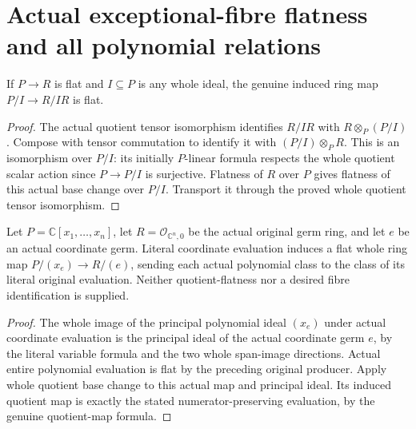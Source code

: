 \section{Actual exceptional-fibre flatness and all polynomial relations}

\begin{lemma}
\label{hir:actual-flat-quotient-ring-base-change}
\leanok
If $P\to R$ is flat and $I\subseteq P$ is any whole ideal, the genuine
induced ring map $P/I\to R/IR$ is flat.
\end{lemma}
\begin{proof}
The actual quotient tensor isomorphism identifies $R/IR$ with
$R\otimes_P(P/I)$. Compose with tensor commutation to identify it with
$(P/I)\otimes_P R$. This is an isomorphism over $P/I$: its initially
$P$-linear formula respects the whole quotient scalar action since
$P\to P/I$ is surjective. Flatness of $R$ over $P$ gives flatness of
this actual base change over $P/I$. Transport it through the proved
whole quotient tensor isomorphism.
\end{proof}

\begin{theorem}
\label{hir:actual-original-exceptional-fibre-polynomial-flatness}
\leanok
Let $P=\mathbb C[x_1,\ldots,x_n]$, let
$R=\mathcal O_{\mathbb C^n,0}$ be the actual original germ ring,
and let $e$ be an actual coordinate germ. Literal coordinate evaluation
induces a flat whole ring map $P/(x_e)\to R/(e)$, sending each actual
polynomial class to the class of its literal original evaluation.
Neither quotient-flatness nor a desired fibre identification is supplied.
\end{theorem}
\begin{proof}
The whole image of the principal polynomial ideal $(x_e)$ under actual
coordinate evaluation is the principal ideal of the actual coordinate
germ $e$, by the literal variable formula and the two whole span-image
directions. Actual entire polynomial evaluation is flat by the preceding
original producer. Apply whole quotient base change to this actual map
and principal ideal. Its induced quotient map is exactly the stated
numerator-preserving evaluation, by the genuine quotient-map formula.
\end{proof}

